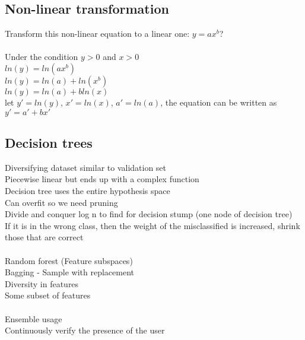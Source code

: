 \documentclass[11pt]{article}
\begin{document}
\subsection*{Non-linear transformation}
Transform this non-linear equation to a linear one: $y = ax^b$?
\\\\
 Under the condition $y>0$ and $x>0$
 \\
$ln(y)=ln(ax^b)$
\\
$ln(y)=ln(a)+ln(x^b)$
\\
$ln(y)=ln(a)+bln(x)$
\\
let $y'=ln(y)$, $x'=ln(x)$, $a'=ln(a)$, the equation can be written as $y'=a'+bx'$
\subsection*{Decision trees}
Diversifying dataset similar to validation set\\
Piecewise linear but ends up with a complex function\\
Decision tree uses the entire hypothesis space\\
Can overfit so we need pruning
\\
Divide and conquer log n to find \theta for decision stump (one node of decision tree)
\\
If it is in the wrong class, then the weight of the misclassified is increased, shrink those that are correct\\\\
Random forest (Feature subspaces) \\
Bagging - Sample with replacement\\
Diversity in features\\
Some subset of features\\
\\
Ensemble usage\\
Continuously verify the presence of the user
\end{document}
